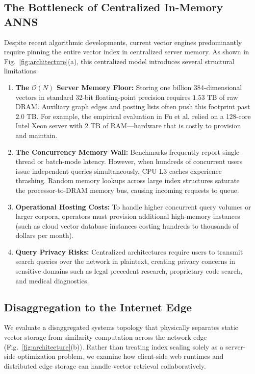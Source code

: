 \documentclass[11pt,journal,compsoc,onecolumn]{IEEEtran}
\begin{document}
\subsection{The Bottleneck of Centralized In-Memory ANNS}
Despite recent algorithmic developments, current vector engines predominantly require pinning the entire vector index in centralized server memory. As shown in Fig.~\ref{fig:architecture}(a), this centralized model introduces several structural limitations:
\begin{enumerate}
    \item \textbf{The $\mathcal{O}(N)$ Server Memory Floor:} Storing one billion 384-dimensional vectors in standard 32-bit floating-point precision requires $1.53\text{ TB}$ of raw DRAM. Auxiliary graph edges and posting lists often push this footprint past $2.0\text{ TB}$. For example, the empirical evaluation in Fu et al. \cite{fu2026geometric} relied on a 128-core Intel Xeon server with $2\text{ TB}$ of RAM---hardware that is costly to provision and maintain.
    \item \textbf{The Concurrency Memory Wall:} Benchmarks frequently report single-thread or batch-mode latency. However, when hundreds of concurrent users issue independent queries simultaneously, CPU L3 caches experience thrashing. Random memory lookups across large index structures saturate the processor-to-DRAM memory bus, causing incoming requests to queue.
    \item \textbf{Operational Hosting Costs:} To handle higher concurrent query volumes or larger corpora, operators must provision additional high-memory instances (such as cloud vector database instances costing hundreds to thousands of dollars per month).
    \item \textbf{Query Privacy Risks:} Centralized architectures require users to transmit search queries over the network in plaintext, creating privacy concerns in sensitive domains such as legal precedent research, proprietary code search, and medical diagnostics.
\end{enumerate}

\subsection{Disaggregation to the Internet Edge}
We evaluate a disaggregated systems topology that physically separates static vector storage from similarity computation across the network edge (Fig.~\ref{fig:architecture}(b)). Rather than treating index scaling solely as a server-side optimization problem, we examine how client-side web runtimes and distributed edge storage can handle vector retrieval collaboratively.
\end{document}
